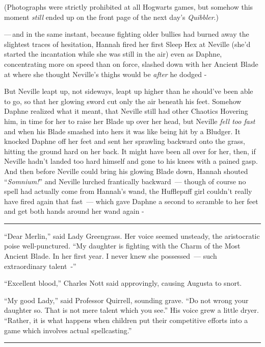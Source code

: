 (Photographs were strictly prohibited at all Hogwarts games, but somehow this moment \emph{still} ended up on the front page of the next day's \emph{Quibbler}.)

---\,and in the same instant, because fighting older bullies had burned away the slightest traces of hesitation, Hannah fired her first Sleep Hex at Neville (she'd started the incantation while she was still in the air) even as Daphne, concentrating more on speed than on force, slashed down with her Ancient Blade at where she thought Neville's thighs would be \emph{after} he dodged -

But Neville leapt up, not sideways, leapt up higher than he should've been able to go, so that her glowing sword cut only the air beneath his feet. Somehow Daphne realized what it meant, that Neville still had other Chaotics Hovering him, in time for her to raise her Blade up over her head, but Neville \emph{fell too fast} and when his Blade smashed into hers it was like being hit by a Bludger. It knocked Daphne off her feet and sent her sprawling backward onto the grass, hitting the ground hard on her back. It might have been all over for her, then, if Neville hadn't landed too hard himself and gone to his knees with a pained gasp. And then before Neville could bring his glowing Blade down, Hannah shouted ``\emph{Somnium!}'' and Neville lurched frantically backward~--- though of course no spell had actually come from Hannah's wand, the Hufflepuff girl couldn't really have fired again that fast~--- which gave Daphne a second to scramble to her feet and get both hands around her wand again -

\begin{center}\rule{3in}{0.4pt}\end{center}

``Dear Merlin,'' said Lady Greengrass. Her voice seemed unsteady, the aristocratic poise well-punctured. ``My daughter is fighting with the Charm of the Most Ancient Blade. In her first year. I never knew she possessed~--- such extraordinary talent~-''

``Excellent blood,'' Charles Nott said approvingly, causing Augusta to snort.

``My good Lady,'' said Professor Quirrell, sounding grave. ``Do not wrong your daughter so. That is not mere talent which you see.'' His voice grew a little dryer. ``Rather, it is what happens when children put their competitive efforts into a game which involves actual spellcasting.''

\begin{center}\rule{3in}{0.4pt}\end{center}


